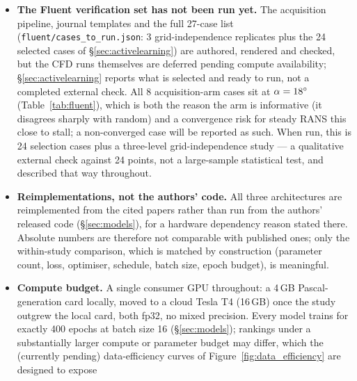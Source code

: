 \documentclass[11pt,a4paper]{article}
\begin{document}
\begin{itemize}
        RANS, one turbulence model (Spalart--Allmaras), one solver family
        (OpenFOAM, upstream). DrivAerNet++ (3D cars) is this project's
        designated extension but requires an interactive data-access step
        outside the current scope and contributes zero results here; no claim
        in this paper should be read as extending to 3D geometry, compressible
        flow, or any solver other than the one AirfRANS was generated with.
  \item \textbf{The Fluent verification set has not been run yet.} The
        acquisition pipeline, journal templates and the full 27-case list
        (\texttt{fluent/cases\_to\_run.json}: 3 grid-independence replicates
        plus the 24 selected cases of \S\ref{sec:activelearning}) are authored,
        rendered and checked, but the CFD runs themselves are deferred pending
        compute availability; \S\ref{sec:activelearning} reports what is
        selected and ready to run, not a completed external check. All 8
        acquisition-arm cases sit at $\alpha=18^{\circ}$
        (Table~\ref{tab:fluent}), which is both the reason the arm is
        informative (it disagrees sharply with random) and a convergence risk
        for steady RANS this close to stall; a non-converged case will be
        reported as such. When run, this is 24 selection cases plus a
        three-level grid-independence study --- a qualitative external check
        against 24 points, not a large-sample statistical test, and described
        that way throughout.
  \item \textbf{Reimplementations, not the authors' code.} All three
        architectures are reimplemented from the cited papers rather than run
        from the authors' released code (\S\ref{sec:models}), for a hardware
        dependency reason stated there. Absolute numbers are therefore not
        comparable with published ones; only the within-study comparison,
        which is matched by construction (parameter count, loss, optimiser,
        schedule, batch size, epoch budget), is meaningful.
  \item \textbf{Compute budget.} A single consumer GPU throughout: a 4\,GB
        Pascal-generation card locally, moved to a cloud Tesla T4 (16\,GB) once
        the study outgrew the local card, both fp32, no mixed precision. Every
        model trains for exactly 400 epochs at batch size 16
        (\S\ref{sec:models}); rankings under a substantially larger compute or
        parameter budget may differ, which the (currently pending) data-efficiency
        curves of Figure~\ref{fig:data_efficiency} are designed to expose

\end{itemize}
\end{document}

